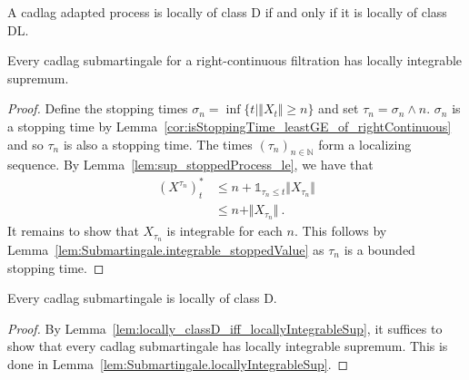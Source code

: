\begin{lemma}\label{lem:locally_classD_iff_locally_classDL}
A cadlag adapted process is locally of class D if and only if it is locally of class DL.
\end{lemma}




\begin{lemma}\label{lem:Submartingale.locallyIntegrableSup}
Every cadlag submartingale for a right-continuous filtration has locally integrable supremum.
\end{lemma}

\begin{proof}
Define the stopping times $\sigma_n = \inf\{t \mid \Vert X_t \Vert \ge n\}$ and set $\tau_n = \sigma_n \wedge n$.
$\sigma_n$ is a stopping time by Lemma~\ref{cor:isStoppingTime_leastGE_of_rightContinuous} and so $\tau_n$ is also a stopping time.
The times $(\tau_n)_{n \in \mathbb{N}}$ form a localizing sequence.
By Lemma~\ref{lem:sup_stoppedProcess_le}, we have that
\begin{align*}
  (X^{\tau_n})^*_t
  & \le n + \mathbb{1}_{\tau_n \le t} \Vert X_{\tau_n} \Vert \\
  & \le n + \Vert X_{\tau_n} \Vert
  \: .
\end{align*}
It remains to show that $X_{\tau_n}$ is integrable for each $n$.
This follows by Lemma~\ref{lem:Submartingale.integrable_stoppedValue} as $\tau_n$ is a bounded stopping time.
\end{proof}



\begin{lemma}\label{lem:Submartingale.locally_classD}
Every cadlag submartingale is locally of class D.
\end{lemma}

\begin{proof}
By Lemma~\ref{lem:locally_classD_iff_locallyIntegrableSup}, it suffices to show that every cadlag submartingale has locally integrable supremum.
This is done in Lemma~\ref{lem:Submartingale.locallyIntegrableSup}.
\end{proof}


